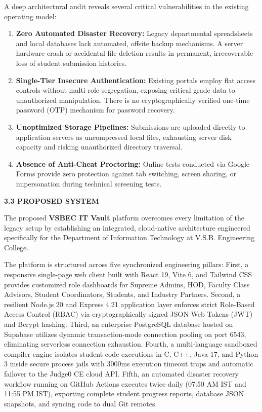 {A deep architectural audit reveals several critical vulnerabilities in the existing operating model:
\begin{enumerate}[noitemsep,topsep=2pt,leftmargin=*]
  \item \textbf{Zero Automated Disaster Recovery:} Legacy departmental spreadsheets and local databases lack automated, offsite backup mechanisms. A server hardware crash or accidental file deletion results in permanent, irrecoverable loss of student submission histories.
  \item \textbf{Single-Tier Insecure Authentication:} Existing portals employ flat access controls without multi-role segregation, exposing critical grade data to unauthorized manipulation. There is no cryptographically verified one-time password (OTP) mechanism for password recovery.
  \item \textbf{Unoptimized Storage Pipelines:} Submissions are uploaded directly to application servers as uncompressed local files, exhausting server disk capacity and risking unauthorized directory traversal.
  \item \textbf{Absence of Anti-Cheat Proctoring:} Online tests conducted via Google Forms provide zero protection against tab switching, screen sharing, or impersonation during technical screening tests.
\end{enumerate}

\vspace{0.4cm}
{\fontsize{14pt}{18pt}\selectfont\bfseries 3.3 PROPOSED SYSTEM\par}
\vspace{0.3cm}

The proposed \textbf{VSBEC IT Vault} platform overcomes every limitation of the legacy setup by establishing an integrated, cloud-native architecture engineered specifically for the Department of Information Technology at V.S.B. Engineering College.

The platform is structured across five synchronized engineering pillars:
First, a responsive single-page web client built with React 19, Vite 6, and Tailwind CSS provides customized role dashboards for Supreme Admins, HOD, Faculty Class Advisors, Student Coordinators, Students, and Industry Partners.
Second, a resilient Node.js 20 and Express 4.21 application layer enforces strict Role-Based Access Control (RBAC) via cryptographically signed JSON Web Tokens (JWT) and Bcrypt hashing.
Third, an enterprise PostgreSQL database hosted on Supabase utilizes dynamic transaction-mode connection pooling on port 6543, eliminating serverless connection exhaustion.
Fourth, a multi-language sandboxed compiler engine isolates student code executions in C, C++, Java 17, and Python 3 inside secure process jails with 3000ms execution timeout traps and automatic failover to the Judge0 CE cloud API.
Fifth, an automated disaster recovery workflow running on GitHub Actions executes twice daily (07:50 AM IST and 11:55 PM IST), exporting complete student progress reports, database JSON snapshots, and syncing code to dual Git remotes.

}
